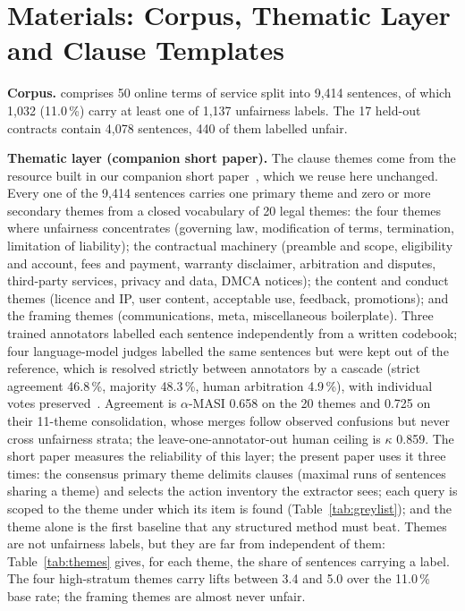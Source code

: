 \section{Materials: Corpus, Thematic Layer and Clause Templates}
\label{sec:materials}
\label{sec:layer}
\label{sec:templates}
\textbf{Corpus.} \corpus{} comprises 50 online terms of service split into 9,414 sentences, of which 1,032 (11.0\,\%) carry at least one of 1,137 unfairness labels. The 17 held-out contracts contain 4,078 sentences, 440 of them labelled unfair.

\textbf{Thematic layer (companion short paper).} The clause themes come from the resource built in our companion short paper~\cite{elazhar2026thematic}, which we reuse here unchanged. Every one of the 9,414 sentences carries one primary theme and zero or more secondary themes from a closed vocabulary of 20 legal themes: the four themes where unfairness concentrates (governing law, modification of terms, termination, limitation of liability); the contractual machinery (preamble and scope, eligibility and account, fees and payment, warranty disclaimer, arbitration and disputes, third-party services, privacy and data, DMCA notices); the content and conduct themes (licence and IP, user content, acceptable use, feedback, promotions); and the framing themes (communications, meta, miscellaneous boilerplate). Three trained annotators labelled each sentence independently from a written codebook; four language-model judges labelled the same sentences but were kept out of the reference, which is resolved strictly between annotators by a cascade (strict agreement 46.8\,\%, majority 48.3\,\%, human arbitration 4.9\,\%), with individual votes preserved~\cite{krippendorff2018content,passonneau2006masi,artstein2008intercoder,braun2024differ}. Agreement is $\alpha$-MASI 0.658 on the 20 themes and 0.725 on their 11-theme consolidation, whose merges follow observed confusions but never cross unfairness strata; the leave-one-annotator-out human ceiling is $\kappa$ 0.859. The short paper measures the reliability of this layer; the present paper uses it three times: the consensus primary theme delimits clauses (maximal runs of sentences sharing a theme) and selects the action inventory the extractor sees; each query is scoped to the theme under which its item is found (Table~\ref{tab:greylist}); and the theme alone is the first baseline that any structured method must beat. Themes are not unfairness labels, but they are far from independent of them: Table~\ref{tab:themes} gives, for each theme, the share of sentences carrying a \corpus{} label. The four high-stratum themes carry lifts between 3.4 and 5.0 over the 11.0\,\% base rate; the framing themes are almost never unfair.

